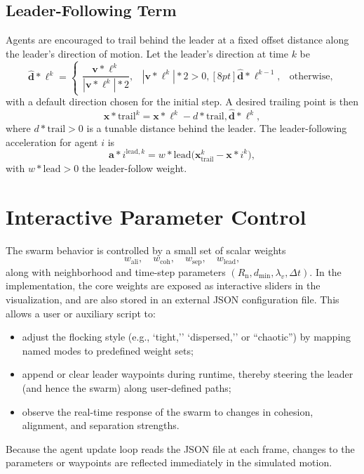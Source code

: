 \documentclass[12pt]{article}
\begin{document}
\subsection{Leader-Following Term}
Agents are encouraged to trail behind the leader at a fixed offset distance along the leader's direction of motion. Let the leader's direction at time $k$ be
\begin{equation}
\hat{\mathbf{d}}*\ell^k =
\begin{cases}
\dfrac{\mathbf{v}*\ell^k}{|\mathbf{v}*\ell^k|*2}, & |\mathbf{v}*\ell^k|*2 > 0, [8pt]
\hat{\mathbf{d}}*\ell^{k-1}, & \text{otherwise},
\end{cases}
\end{equation}
with a default direction chosen for the initial step. A desired trailing point is then
\begin{equation}
\mathbf{x}*\mathrm{trail}^k = \mathbf{x}*\ell^k - d*\mathrm{trail}, \hat{\mathbf{d}}*\ell^k,
\end{equation}
where $d*\mathrm{trail} > 0$ is a tunable distance behind the leader. The leader-following acceleration for agent $i$ is
\begin{equation}
\mathbf{a}*i^{\mathrm{lead},k} = w*\mathrm{lead} \bigl( \mathbf{x}_\mathrm{trail}^k - \mathbf{x}*i^k \bigr),
\end{equation}
with $w*\mathrm{lead} > 0$ the leader-follow weight.

\section{Interactive Parameter Control}
The swarm behavior is controlled by a small set of scalar weights
\begin{equation}
w_\mathrm{ali}, \quad w_\mathrm{coh}, \quad w_\mathrm{sep}, \quad w_\mathrm{lead},
\end{equation}
along with neighborhood and time-step parameters $(R_\mathrm{n}, d_\mathrm{min}, \lambda_v, \Delta t)$. In the implementation, the core weights are exposed as interactive sliders in the visualization, and are also stored in an external JSON configuration file. This allows a user or auxiliary script to:
\begin{itemize}
\item adjust the flocking style (e.g., `tight,'' `dispersed,'' or ``chaotic'') by mapping named modes to predefined weight sets;
\item append or clear leader waypoints during runtime, thereby steering the leader (and hence the swarm) along user-defined paths;
\item observe the real-time response of the swarm to changes in cohesion, alignment, and separation strengths.
\end{itemize}
Because the agent update loop reads the JSON file at each frame, changes to the parameters or waypoints are reflected immediately in the simulated motion.
\end{document}
